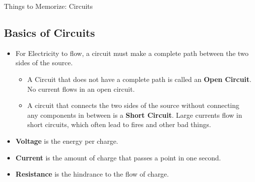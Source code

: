 \documentclass[letterpaper, 12pt]{article}
\begin{document}
	


\begin{center}Things to Memorize: Circuits
\end{center}

\subsection*{Basics of Circuits}
\begin{itemize}
	\item For Electricity to flow, a circuit must make a complete path between the two sides of the source. 
	\begin{itemize}
		\item A Circuit that does not have a complete path is called an \textbf{Open Circuit}.  No current flows in an open circuit.
		\item A circuit that connects the two sides of the source without connecting any components in between is a \textbf{Short Circuit}.  Large currents flow in short circuits, which often lead to fires and other bad things.
	\end{itemize}
	\item \textbf{Voltage} is the energy per charge.
	\item \textbf{Current} is the amount of charge that passes a point in one second. 
	\item \textbf{Resistance} is the hindrance to the flow of charge.
\end{itemize}
\end{document}
